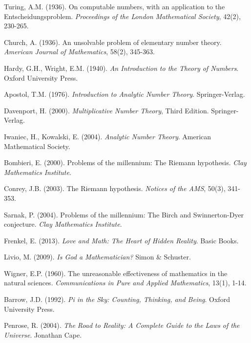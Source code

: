 \documentclass[12pt]{article}
\theoremstyle{plain}
\theoremstyle{definition}
\begin{document}
\begin{thebibliography}{99}
 Turing, A.M. (1936). On computable numbers, with an application to the Entscheidungsproblem. \emph{Proceedings of the London Mathematical Society}, 42(2), 230-265.

 Church, A. (1936). An unsolvable problem of elementary number theory. \emph{American Journal of Mathematics}, 58(2), 345-363.

 Hardy, G.H., Wright, E.M. (1940). \emph{An Introduction to the Theory of Numbers}. Oxford University Press.

 Apostol, T.M. (1976). \emph{Introduction to Analytic Number Theory}. Springer-Verlag.

 Davenport, H. (2000). \emph{Multiplicative Number Theory}, Third Edition. Springer-Verlag.

 Iwaniec, H., Kowalski, E. (2004). \emph{Analytic Number Theory}. American Mathematical Society.

 Bombieri, E. (2000). Problems of the millennium: The Riemann hypothesis. \emph{Clay Mathematics Institute}.

 Conrey, J.B. (2003). The Riemann hypothesis. \emph{Notices of the AMS}, 50(3), 341-353.

 Sarnak, P. (2004). Problems of the millennium: The Birch and Swinnerton-Dyer conjecture. \emph{Clay Mathematics Institute}.

 Frenkel, E. (2013). \emph{Love and Math: The Heart of Hidden Reality}. Basic Books.

 Livio, M. (2009). \emph{Is God a Mathematician?} Simon & Schuster.

 Wigner, E.P. (1960). The unreasonable effectiveness of mathematics in the natural sciences. \emph{Communications in Pure and Applied Mathematics}, 13(1), 1-14.

 Barrow, J.D. (1992). \emph{Pi in the Sky: Counting, Thinking, and Being}. Oxford University Press.

 Penrose, R. (2004). \emph{The Road to Reality: A Complete Guide to the Laws of the Universe}. Jonathan Cape.

\end{thebibliography}
\end{document}
